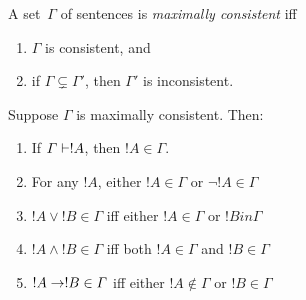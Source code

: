 \documentclass[open-logic-section]{subfiles}
\begin{document}

\begin{defn}
A set~$\Gamma$ of sentences is \emph{maximally consistent} iff
\begin{enumerate}
\item $\Gamma$ is consistent, and
\item if $\Gamma \subsetneq \Gamma'$, then $\Gamma'$ is inconsistent.
\end{enumerate}
\end{defn}

\begin{prop}
Suppose $\Gamma$ is maximally consistent. Then:
\begin{enumerate}
\item If $\Gamma \Proves !A$, then $!A \in \Gamma$.
\item For any $!A$, either $!A \in \Gamma$ or $\lnot !A \in \Gamma$
\item $!A \lor !B \in \Gamma$ iff either $!A \in \Gamma$ or $!B in \Gamma$
\item $!A \land !B \in \Gamma$ iff both $!A \in \Gamma$ and $!B \in \Gamma$
\item $!A \to !B \in \Gamma$ iff either $!A \notin \Gamma$ or $!B \in \Gamma$
\end{enumerate}
\end{prop}

\end{document}
